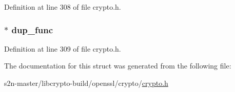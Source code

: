 Definition at line 308 of file crypto.\+h.

\subsubsection[{\texorpdfstring{dup\+\_\+func}{dup_func}}]{ $\ast$ dup\+\_\+func}\hypertarget{structcrypto__ex__data__func__st_a430779382e5b3a9d7c4e9f6f6bb76bf9}{}\label{structcrypto__ex__data__func__st_a430779382e5b3a9d7c4e9f6f6bb76bf9}


Definition at line 309 of file crypto.\+h.



The documentation for this struct was generated from the following file\+:\begin{DoxyCompactItemize}
\item 
s2n-\/master/libcrypto-\/build/openssl/crypto/\hyperlink{crypto_2crypto_8h}{crypto.\+h}\end{DoxyCompactItemize}
